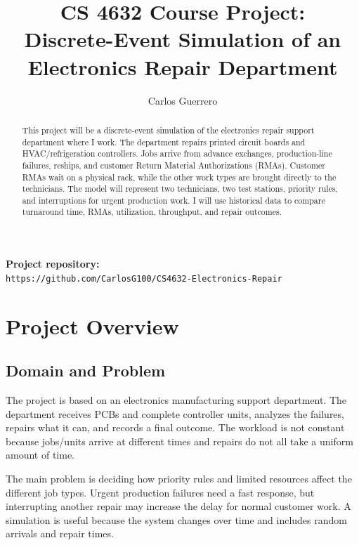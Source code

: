 \documentclass[12pt, letterpaper, twoside]{article}
\title{\textbf{CS 4632 Course Project:\\
Discrete-Event Simulation of an Electronics Repair Department}}
\author{Carlos Guerrero}
\affiliation{Kennesaw State University}
\begin{document}
\maketitle

\begin{abstract}
    \noindent
    This project will be a discrete-event simulation of the electronics repair support
    department where I work. The department repairs printed circuit boards and
    HVAC/refrigeration controllers. Jobs arrive from advance exchanges, production-line
    failures, reships, and customer Return Material Authorizations (RMAs). Customer RMAs
    wait on a physical rack, while the other work types are brought directly to the
    technicians. The model will represent two technicians, two
    test stations, priority rules, and interruptions for urgent production work. I will use
    historical data to compare turnaround time, RMAs, utilization,
    throughput, and repair outcomes.

\end{abstract}

\vspace{1cm}

\noindent
\textbf{Project repository:}\\
\texttt{https://github.com/CarlosG100/CS4632-Electronics-Repair}

\thispagestyle{firstpage}

\pagebreak


\newgeometry{}

\section{Project Overview}
\label{sec:overview}

\subsection{Domain and Problem}

The project is based on an electronics manufacturing support department. The department
receives PCBs and complete controller units, analyzes the failures, repairs what it can,
and records a final outcome. The workload is not constant because jobs/units arrive at
different times and repairs do not all take a uniform amount of time.

The main problem is deciding how priority rules and limited resources affect the different
job types. Urgent production failures need a fast response, but interrupting another repair
may increase the delay for normal customer work. A simulation is useful because the system
changes over time and includes random arrivals and repair times.
\end{document}
